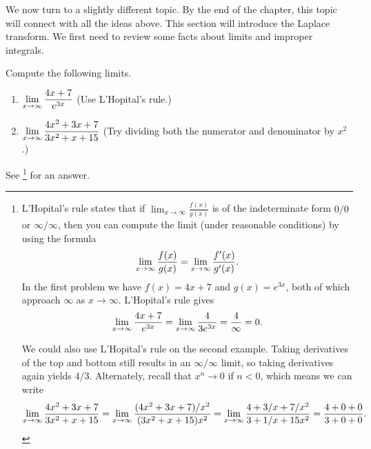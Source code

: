 We now turn to a slightly different topic. By the end of the chapter, this topic will connect with all the ideas above. This section will introduce the Laplace transform. We first need to review some facts about limits and improper integrals. 

\begin{review*}
 Compute the following limits.
\begin{enumerate}
 \item $\displaystyle\lim_{x\to \infty} \frac{4x+7}{e^{3x}}$ (Use L'Hopital's rule.)
 \item $\displaystyle\lim_{x\to \infty} \frac{4x^2+3x+7}{3x^2+x+15}$ (Try dividing both the numerator and denominator by $x^2$.) 
\end{enumerate}
 See \footnote{
L'Hopital's rule states that if $\lim_{x\to\infty}\frac{f(x)}{g(x)}$ is of the indeterminate form $0/0$ or $\infty/\infty$, then you can compute the limit (under reasonable conditions) by using the formula 
$$\displaystyle\lim_{x\to\infty}\frac{f(x)}{g(x)} = \lim_{x\to\infty}\frac{f'(x)}{g'(x)}.$$
In the first problem we have $f(x) = 4x+7$ and $g(x) = e^{3x}$, both of which approach $\infty$ as $x\to \infty$. L'Hopital's rule gives
$$\displaystyle\lim_{x\to \infty} \frac{4x+7}{e^{3x}} = \lim_{x\to \infty} \frac{4}{3e^{3x}} = \frac{4}{\infty} = 0. $$

We could also use L'Hopital's rule on the second example.  Taking derivatives of the top and bottom still results in an $\infty/\infty$ limit, so taking derivatives again yields $4/3$.  Alternately, recall that $x^n\to 0$ if $n<0$, which means we can write 
$$\displaystyle\lim_{x\to \infty} \frac{4x^2+3x+7}{3x^2+x+15} 
=\displaystyle\lim_{x\to \infty} \frac{(4x^2+3x+7)/x^2}{(3x^2+x+15)x^2} 
=\displaystyle\lim_{x\to \infty} \frac{4+3/x+7/x^2}{3+1/x+15x^2}
= \displaystyle\frac{4+0+0}{3+0+0}. 
$$
} for an answer. 
\end{review*}


